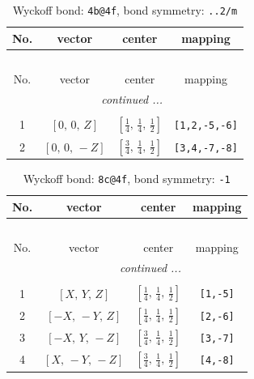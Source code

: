 \documentclass[fleqn,8pt]{jsarticle}
\begin{document}
\renewcommand{\arraystretch}{1.2}
\begin{longtable}{cccc}
\caption{Wyckoff bond: {\tt 4b@4f}, bond symmetry: {\tt ..2/m}}
 \\
 \hline \hline
No. & vector & center & mapping \\ \hline \endfirsthead

\multicolumn{3}{l}{\tablename\ \thetable{}} \\
 \hline \hline
No. & vector & center & mapping \\ \hline \endhead

 \hline \hline
\multicolumn{3}{r}{\footnotesize\it continued ...} \\ \endfoot

 \hline \hline
\multicolumn{3}{r}{} \\ \endlastfoot

1 & $\left[ 0,\, 0,\, Z \right]$ & $\left[ \frac{1}{4},\, \frac{1}{4},\, \frac{1}{2} \right]$ & {\tt [1,2,-5,-6]} \\ \hline
2 & $\left[ 0,\, 0,\, - Z \right]$ & $\left[ \frac{3}{4},\, \frac{1}{4},\, \frac{1}{2} \right]$ & {\tt [3,4,-7,-8]} \\
\end{longtable}
\renewcommand{\arraystretch}{1.2}
\begin{longtable}{cccc}
\caption{Wyckoff bond: {\tt 8c@4f}, bond symmetry: {\tt -1}}
 \\
 \hline \hline
No. & vector & center & mapping \\ \hline \endfirsthead

\multicolumn{3}{l}{\tablename\ \thetable{}} \\
 \hline \hline
No. & vector & center & mapping \\ \hline \endhead

 \hline \hline
\multicolumn{3}{r}{\footnotesize\it continued ...} \\ \endfoot

 \hline \hline
\multicolumn{3}{r}{} \\ \endlastfoot

1 & $\left[ X,\, Y,\, Z \right]$ & $\left[ \frac{1}{4},\, \frac{1}{4},\, \frac{1}{2} \right]$ & {\tt [1,-5]} \\ \hline
2 & $\left[ - X,\, - Y,\, Z \right]$ & $\left[ \frac{1}{4},\, \frac{1}{4},\, \frac{1}{2} \right]$ & {\tt [2,-6]} \\ \hline
3 & $\left[ - X,\, Y,\, - Z \right]$ & $\left[ \frac{3}{4},\, \frac{1}{4},\, \frac{1}{2} \right]$ & {\tt [3,-7]} \\ \hline
4 & $\left[ X,\, - Y,\, - Z \right]$ & $\left[ \frac{3}{4},\, \frac{1}{4},\, \frac{1}{2} \right]$ & {\tt [4,-8]} \\
\end{longtable}
\end{document}
